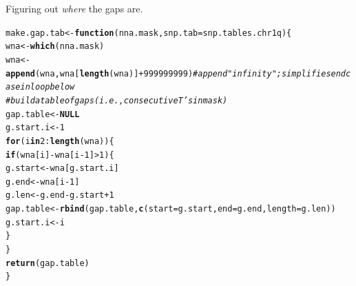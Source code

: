 \documentclass{article}\usepackage[]{graphicx}\usepackage[]{color}
\makeatletter
\newcommand{\hlnum}[1]{\textcolor[rgb]{0.686,0.059,0.569}{#1}}%
\newcommand{\hlcom}[1]{\textcolor[rgb]{0.678,0.584,0.686}{\textit{#1}}}%
\newcommand{\hlopt}[1]{\textcolor[rgb]{0,0,0}{#1}}%
\newcommand{\hlstd}[1]{\textcolor[rgb]{0.345,0.345,0.345}{#1}}%
\newcommand{\hlkwa}[1]{\textcolor[rgb]{0.161,0.373,0.58}{\textbf{#1}}}%
\newcommand{\hlkwb}[1]{\textcolor[rgb]{0.69,0.353,0.396}{#1}}%
\newcommand{\hlkwc}[1]{\textcolor[rgb]{0.333,0.667,0.333}{#1}}%
\newcommand{\hlkwd}[1]{\textcolor[rgb]{0.737,0.353,0.396}{\textbf{#1}}}%
\newenvironment{kframe}{%
 \def\at@end@of@kframe{}%
 \ifinner\ifhmode%
  \def\at@end@of@kframe{\end{minipage}}%
  \begin{minipage}{\columnwidth}%
 \fi\fi%
 \def\FrameCommand##1{\hskip\@totalleftmargin \hskip-\fboxsep
 \colorbox{shadecolor}{##1}\hskip-\fboxsep
     \hskip-\linewidth \hskip-\@totalleftmargin \hskip\columnwidth}%
 \MakeFramed {\advance\hsize-\width
   \@totalleftmargin\z@ \linewidth\hsize
   \@setminipage}}%
 {\par\unskip\endMakeFramed%
 \at@end@of@kframe}
\newenvironment{knitrout}{}{} %
\makeatother
\begin{document}
Figuring out \emph{where} the gaps are.

\begin{knitrout}\footnotesize
{}\color{fgcolor}\begin{kframe}
\begin{alltt}
\hlstd{make.gap.tab} \hlkwb{<-} \hlkwa{function}\hlstd{(}\hlkwc{nna.mask}\hlstd{,} \hlkwc{snp.tab}\hlstd{=snp.tables.chr1q)\{}
  \hlstd{wna} \hlkwb{<-} \hlkwd{which}\hlstd{(nna.mask)}
  \hlstd{wna} \hlkwb{<-} \hlkwd{append}\hlstd{(wna,wna[}\hlkwd{length}\hlstd{(wna)]}\hlopt{+}\hlnum{999999999}\hlstd{)} \hlcom{#append "infinity"; simplifies end case in loop below}
  \hlcom{#build a table of gaps (i.e., consecutive T's in mask)}
  \hlstd{gap.table} \hlkwb{<-} \hlkwa{NULL}
  \hlstd{g.start.i} \hlkwb{<-} \hlnum{1}
  \hlkwa{for}\hlstd{(i} \hlkwa{in} \hlnum{2}\hlopt{:}\hlkwd{length}\hlstd{(wna))\{}
    \hlkwa{if}\hlstd{(wna[i]}\hlopt{-}\hlstd{wna[i}\hlopt{-}\hlnum{1}\hlstd{]}\hlopt{>}\hlnum{1}\hlstd{)\{}
      \hlstd{g.start} \hlkwb{<-} \hlstd{wna[g.start.i]}
      \hlstd{g.end} \hlkwb{<-} \hlstd{wna[i}\hlopt{-}\hlnum{1}\hlstd{]}
      \hlstd{g.len} \hlkwb{<-} \hlstd{g.end}\hlopt{-}\hlstd{g.start}\hlopt{+}\hlnum{1}
      \hlstd{gap.table} \hlkwb{<-}\hlkwd{rbind}\hlstd{(gap.table,} \hlkwd{c}\hlstd{(}\hlkwc{start}\hlstd{=g.start,} \hlkwc{end}\hlstd{=g.end,} \hlkwc{length}\hlstd{=g.len))}
      \hlstd{g.start.i} \hlkwb{<-} \hlstd{i}
    \hlstd{\}}
  \hlstd{\}}
  \hlkwd{return}\hlstd{(gap.table)}
\hlstd{\}}
\end{alltt}
\end{kframe}
\end{knitrout}
\end{document}
